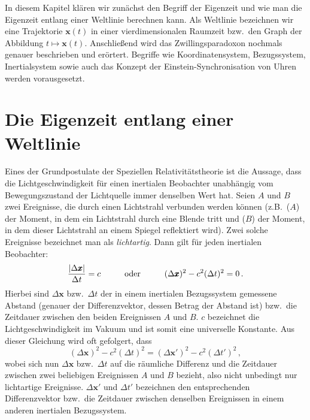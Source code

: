In diesem Kapitel kl\"aren wir zun\"achst den Begriff der Eigenzeit und wie man die
Eigenzeit entlang einer Weltlinie berechnen kann. 
Als Weltlinie bezeichnen wir eine 
Trajektorie $\pmb{x}(t)$ in einer vierdimensionalen Raumzeit
bzw.\ den Graph der Abbildung $t \mapsto \pmb{x}(t)$.  
Anschlie\ss end wird das Zwillingsparadoxon
nochmals genauer beschrieben und er\"ortert. Begriffe wie Koordinatensystem, Bezugssystem,
Inertialsystem sowie auch das Konzept der Einstein-Synchronisation von Uhren werden vorausgesetzt. 
 
\section{Die Eigenzeit entlang einer Weltlinie}

Eines der Grundpostulate der Speziellen Relativit\"atstheorie ist die Aussage, dass die
Lichtgeschwindigkeit f\"ur einen inertialen Beobachter unabh\"angig vom Bewegungszustand
der Lichtquelle immer denselben Wert hat.
 Seien $A$ und $B$ zwei Ereignisse, die durch
einen Lichtstrahl verbunden werden k\"onnen (z.B.\ ($A$) der Moment, in dem ein Lichtstrahl durch eine
Blende tritt und ($B$) der Moment, in dem dieser Lichtstrahl an einem Spiegel reflektiert wird). 
Zwei solche Ereignisse bezeichnet man als \textit{lichtartig}. 
Dann gilt f\"ur jeden inertialen Beobachter:
\begin{equation} 
             \frac{|\Delta \pmb{x}|}{\Delta t}=c   \hspace{1cm} {\rm oder} 
             \hspace{1cm} (\Delta \pmb{x})^2 - c^2 (\Delta t)^2 =0 \, .
\end{equation}
Hierbei sind $\Delta \pmb{x}$ bzw.\ $\Delta t$ der in einem inertialen Bezugssystem gemessene
Abstand (genauer der Differenzvektor, dessen Betrag der Abstand ist) bzw.\ die Zeitdauer 
zwischen den beiden Ereignissen $A$ und $B$. $c$ bezeichnet die
Lichtgeschwindigkeit im Vakuum und ist somit eine universelle Konstante. Aus dieser
Gleichung wird oft gefolgert, dass
\begin{equation} 
\label{eq_Invarianz1}
            (\Delta \pmb{x})^2 - c^2 (\Delta t)^2 = (\Delta \pmb{x}')^2 - c^2 (\Delta t')^2  \, ,
\end{equation}
wobei sich nun $\Delta \pmb{x}$ bzw.\ $\Delta t$ auf die r\"aumliche Differenz und die Zeitdauer 
zwischen zwei beliebigen Ereignissen $A$ und $B$ bezieht, also nicht unbedingt nur lichtartige 
Ereignisse. $\Delta \pmb{x}'$ und $\Delta t'$ bezeichnen den entsprechenden
Differenzvektor bzw.\ die Zeitdauer zwischen denselben Ereignissen 
in einem anderen inertialen Bezugssystem.

